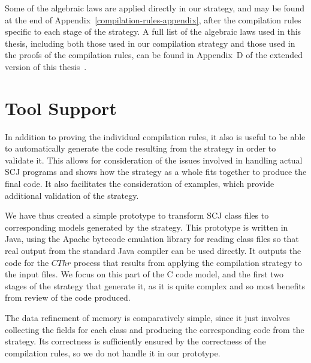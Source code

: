 Some of the algebraic laws are applied directly in our strategy, and
may be found at the end of Appendix~\ref{compilation-rules-appendix},
after the compilation rules specific to each stage of the strategy.
A full list of the algebraic laws used in this thesis, including both
those used in our compilation strategy and those used in the proofs of
the compilation rules, can be found in Appendix~D of the extended
version of this thesis~\cite{baxter2018-extended}.


\section{Tool Support}
\label{tool-support-section}

In addition to proving the individual compilation rules, it also is
useful to be able to automatically generate the code resulting from
the strategy in order to validate it.
This allows for consideration of the issues involved in handling
actual SCJ programs and shows how the strategy as a whole fits
together to produce the final code.
It also facilitates the consideration of examples, which provide
additional validation of the strategy.

We have thus created a simple prototype to transform SCJ class files
to corresponding \Circus{} models generated by the strategy.
This prototype is written in Java, using the Apache bytecode emulation
library for reading class files so that real output from the standard
Java compiler can be used directly.
It outputs the \Circus{} code for the $CThr$ process that results from
applying the compilation strategy to the input files.
We focus on this part of the C code model, and the first two stages of
the strategy that generate it, as it is quite complex and so most
benefits from review of the code produced.

The data refinement of memory is comparatively simple, since it just
involves collecting the fields for each class and producing the
corresponding \Circus{} code from the strategy.
Its correctness is sufficiently ensured by the correctness of the
compilation rules, so we do not handle it in our prototype.

